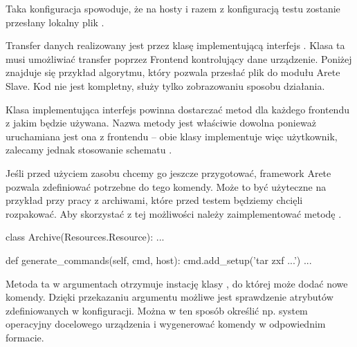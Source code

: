 \documentclass[00-praca-magisterska.tex]{subfiles}
\begin{document}
Taka konfiguracja spowoduje, że na hosty  i  razem z
konfiguracją testu zostanie przesłany lokalny plik .

Transfer danych realizowany jest przez klasę implementującą interfejs
. Klasa ta musi umożliwiać transfer poprzez Frontend kontrolujący
dane urządzenie. Poniżej znajduje się przykład algorytmu, który pozwala przesłać
plik do modułu Arete Slave. Kod nie jest kompletny, służy tylko zobrazowaniu
sposobu działania.


Klasa implementująca interfejs  powinna dostarczać metod
 dla każdego frontendu z jakim będzie używana. Nazwa
metody jest właściwie dowolna ponieważ uruchamiana jest ona z frontendu -- obie
klasy implementuje więc użytkownik, zalecamy jednak stosowanie schematu
.

Jeśli przed użyciem zasobu chcemy go jeszcze przygotować, framework Arete
pozwala zdefiniować potrzebne do tego komendy. Może to być użyteczne na
przykład przy pracy z archiwami, które przed testem będziemy chcięli
rozpakować. Aby skorzystać z tej możliwości należy zaimplementować metodę
.

\begin{pythoncode}
  class Archive(Resources.Resource):
      ...

      def generate_commands(self, cmd, host):
          cmd.add_setup('tar zxf ...')
	  ...
\end{pythoncode}

Metoda ta w argumentach otrzymuje instację klasy , do której
może dodać nowe komendy. Dzięki przekazaniu argumentu  możliwe jest
sprawdzenie atrybutów zdefiniowanych w konfiguracji. Można w ten sposób
określić np. system operacyjny docelowego urządzenia i wygenerować komendy w
odpowiednim formacie.
\end{document}

